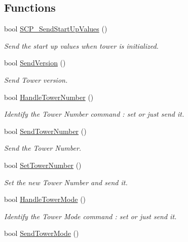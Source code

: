 \subsection*{Functions}
\begin{DoxyCompactItemize}
\item 
bool \hyperlink{group___s_c_p__module_gac0f02823b3b6cbfd179d7f3317152c5b}{S\+C\+P\+\_\+\+Send\+Start\+Up\+Values} ()
\begin{DoxyCompactList}\small\item\em Send the start up values when tower is initialized. \end{DoxyCompactList}\item 
bool \hyperlink{group___s_c_p__module_ga98c8a1e3b4553e906617ccaae8af008e}{Send\+Version} ()
\begin{DoxyCompactList}\small\item\em Send Tower version. \end{DoxyCompactList}\item 
bool \hyperlink{group___s_c_p__module_gae7a31e8ab754938e945e3c1b64268cbb}{Handle\+Tower\+Number} ()
\begin{DoxyCompactList}\small\item\em Identify the Tower Number command \+: set or just send it. \end{DoxyCompactList}\item 
bool \hyperlink{group___s_c_p__module_ga097e050546e21ec862137610d6d314a8}{Send\+Tower\+Number} ()
\begin{DoxyCompactList}\small\item\em Send the Tower Number. \end{DoxyCompactList}\item 
bool \hyperlink{group___s_c_p__module_gadb167a851345d70c7f7e1cb238f9bd57}{Set\+Tower\+Number} ()
\begin{DoxyCompactList}\small\item\em Set the new Tower Number and send it. \end{DoxyCompactList}\item 
bool \hyperlink{group___s_c_p__module_ga57b51fbbcf8a00f4cda682a78c5d1674}{Handle\+Tower\+Mode} ()
\begin{DoxyCompactList}\small\item\em Identify the Tower Mode command \+: set or just send it. \end{DoxyCompactList}\item 
bool \hyperlink{group___s_c_p__module_ga0d7538989aee917b7ede2fe6d36bb82a}{Send\+Tower\+Mode} ()

\end{DoxyCompactItemize}

